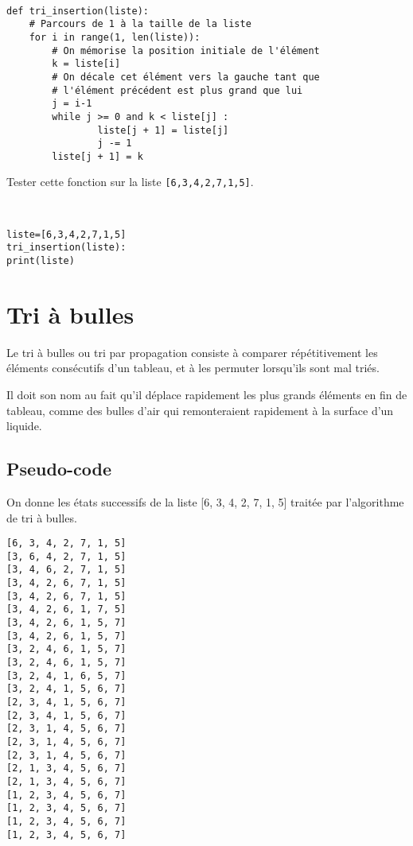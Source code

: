 \begin{solution}~\\
\vspace{-0.7cm}
\begin{verbatim}
def tri_insertion(liste): 
    # Parcours de 1 à la taille de la liste
    for i in range(1, len(liste)):
        # On mémorise la position initiale de l'élément
        k = liste[i]
        # On décale cet élément vers la gauche tant que
        # l'élément précédent est plus grand que lui
        j = i-1
        while j >= 0 and k < liste[j] : 
                liste[j + 1] = liste[j] 
                j -= 1
        liste[j + 1] = k
\end{verbatim}    
\end{solution}

\begin{exercice}
Tester cette fonction sur la liste \verb?[6,3,4,2,7,1,5]?.
\end{exercice}

\begin{solution}~\\
\vspace{-0.7cm}
\begin{verbatim}
liste=[6,3,4,2,7,1,5]
tri_insertion(liste): 
print(liste)
\end{verbatim}    
\end{solution}

\section{Tri à bulles}

Le tri à bulles ou tri par propagation consiste à comparer répétitivement les éléments consécutifs d'un tableau, et à les permuter lorsqu'ils sont mal triés. 

Il doit son nom au fait qu'il déplace rapidement les plus grands éléments en fin de tableau, comme des bulles d'air qui remonteraient rapidement à la surface d'un liquide. 

\subsection{Pseudo-code}

On donne les états successifs de la liste [6, 3, 4, 2, 7, 1, 5] traitée par l'algorithme de tri à bulles.

\begin{verbatim}
[6, 3, 4, 2, 7, 1, 5]
[3, 6, 4, 2, 7, 1, 5]
[3, 4, 6, 2, 7, 1, 5]
[3, 4, 2, 6, 7, 1, 5]
[3, 4, 2, 6, 7, 1, 5]
[3, 4, 2, 6, 1, 7, 5]
[3, 4, 2, 6, 1, 5, 7]
[3, 4, 2, 6, 1, 5, 7]
[3, 2, 4, 6, 1, 5, 7]
[3, 2, 4, 6, 1, 5, 7]
[3, 2, 4, 1, 6, 5, 7]
[3, 2, 4, 1, 5, 6, 7]
[2, 3, 4, 1, 5, 6, 7]
[2, 3, 4, 1, 5, 6, 7]
[2, 3, 1, 4, 5, 6, 7]
[2, 3, 1, 4, 5, 6, 7]
[2, 3, 1, 4, 5, 6, 7]
[2, 1, 3, 4, 5, 6, 7]
[2, 1, 3, 4, 5, 6, 7]
[1, 2, 3, 4, 5, 6, 7]
[1, 2, 3, 4, 5, 6, 7]
[1, 2, 3, 4, 5, 6, 7]
[1, 2, 3, 4, 5, 6, 7]
\end{verbatim}  

